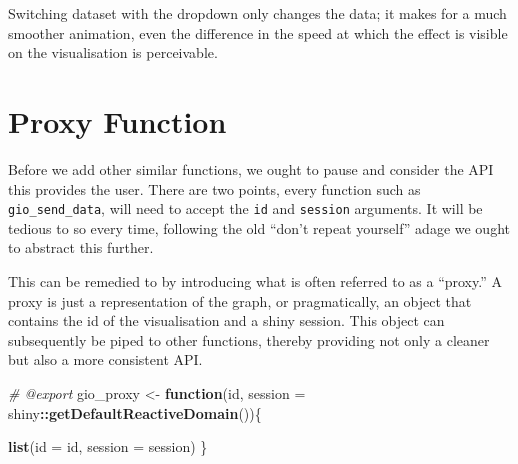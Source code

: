\documentclass[
]{krantz}
\makeatletter
\newenvironment{Shaded}{\begin{snugshade}}{\end{snugshade}}
\newcommand{\CommentTok}[1]{\textcolor[rgb]{0.37,0.37,0.37}{\textit{#1}}}
\newcommand{\ControlFlowTok}[1]{\textcolor[rgb]{0.27,0.27,0.27}{\textbf{#1}}}
\newcommand{\DataTypeTok}[1]{\textcolor[rgb]{0.27,0.27,0.27}{#1}}
\newcommand{\KeywordTok}[1]{\textcolor[rgb]{0.27,0.27,0.27}{\textbf{#1}}}
\newcommand{\NormalTok}[1]{#1}
\newcommand{\OperatorTok}[1]{\textcolor[rgb]{0.43,0.43,0.43}{\textbf{#1}}}
\newcommand{\StringTok}[1]{\textcolor[rgb]{0.5,0.5,0.5}{#1}}
\newenvironment{kframe}{%
\medskip{}
\setlength{\fboxsep}{.8em}
 \def\at@end@of@kframe{}%
 \ifinner\ifhmode%
  \def\at@end@of@kframe{\end{minipage}}%
  \begin{minipage}{\columnwidth}%
 \fi\fi%
 \def\FrameCommand##1{\hskip\@totalleftmargin \hskip-\fboxsep
 \colorbox{shadecolor}{##1}\hskip-\fboxsep
     \hskip-\linewidth \hskip-\@totalleftmargin \hskip\columnwidth}%
 \MakeFramed {\advance\hsize-\width
   \@totalleftmargin\z@ \linewidth\hsize
   \@setminipage}}%
 {\par\unskip\endMakeFramed%
 \at@end@of@kframe}
\renewenvironment{Shaded}{\begin{kframe}}{\end{kframe}}
\makeatother
\begin{document}
\begin{Shaded}
\end{Shaded}

Switching dataset with the dropdown only changes the data; it makes for a much smoother animation, even the difference in the speed at which the effect is visible on the visualisation is perceivable.

\hypertarget{shiny-widgets-proxy}{%
\section{Proxy Function}\label{shiny-widgets-proxy}}

Before we add other similar functions, we ought to pause and consider the API this provides the user. There are two points, every function such as \texttt{gio\_send\_data}, will need to accept the \texttt{id} and \texttt{session} arguments. It will be tedious to so every time, following the old ``don't repeat yourself'' adage we ought to abstract this further.

This can be remedied to by introducing what is often referred to as a ``proxy.'' A proxy is just a representation of the graph, or pragmatically, an object that contains the id of the visualisation and a shiny session. This object can subsequently be piped to other functions, thereby providing not only a cleaner but also a more consistent API.

\begin{Shaded}
\begin{Highlighting}[]
\CommentTok{\#\textquotesingle{} @export}
\NormalTok{gio\_proxy <{-}}\StringTok{ }\ControlFlowTok{function}\NormalTok{(id, }
  \DataTypeTok{session =}\NormalTok{ shiny}\OperatorTok{::}\KeywordTok{getDefaultReactiveDomain}\NormalTok{())\{}

  \KeywordTok{list}\NormalTok{(}\DataTypeTok{id =}\NormalTok{ id, }\DataTypeTok{session =}\NormalTok{ session)}
\NormalTok{\}}
\end{Highlighting}
\end{Shaded}
\end{document}
